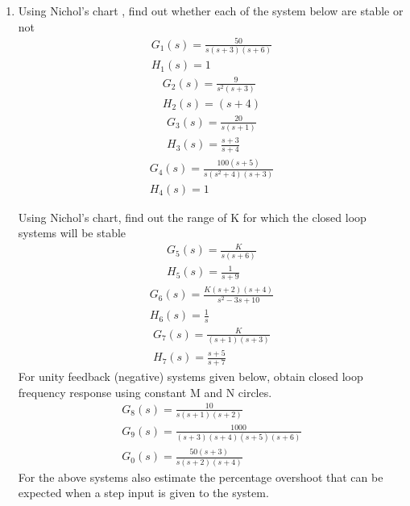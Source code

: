 \begin{enumerate}[label=\thesection.\arabic*.,ref=\thesection.\theenumi]

\item Using Nichol's chart , find out whether each of the system below are stable or not 
\begin{align}
G_1(s)= \frac{50}{s(s+3)(s+6)}
\label{eq:es17btech11009_a}
\\
 H_1(s)= 1
 \label{eq:es17btech11009_b}
\end{align}
\begin{align}
G_2(s)= \frac{9}{s^2(s+3)}
\label{eq:es17btech11009_c}
\\
 H_2(s)= (s+4)
 \label{eq:es17btech11009_d}
\end{align}
\begin{align}
G_3(s)= \frac{20}{s(s+1)}
\label{eq:es17btech11009_e}
\\
 H_3(s)= \frac{s+3}{s+4}
 \label{eq:es17btech11009_f}
\end{align}
\begin{align}
G_4(s)= \frac{100(s+5)}{s(s^2+4)(s+3)}
\label{eq:es17btech11009_g}
\\
 H_4(s)= 1
 \label{eq:es17btech11009_h}
\end{align}

Using Nichol's chart, find out the range of K for which the closed loop systems will be stable
\begin{align}
G_5(s)= \frac{K}{s(s+6)}
\label{eq:es17btech11009_i}
\\
 H_5(s)= \frac{1}{s+9}
 \label{eq:es17btech11009_j}
\end{align}
\begin{align}
G_6(s)= \frac{K(s+2)(s+4)}{s^2 - 3s +10}
\label{eq:es17btech11009_k}
\\
 H_6(s)= \frac{1}{s}
 \label{eq:es17btech11009_l}
\end{align}
\begin{align}
G_7(s)= \frac{K}{(s+1)(s+3)}
\label{eq:es17btech11009_m}
\\
 H_7(s)= \frac{s+5}{s+7}
 \label{eq:es17btech11009_n}
\end{align}
For unity feedback (negative) systems given below, obtain closed loop frequency response using constant M and N circles.
\begin{align}
G_8(s)= \frac{10}{s(s+1)(s+2)}
 \label{eq:es17btech11009_o}
 \\
G_9(s)= \frac{1000}{(s+3)(s+4)(s+5)(s+6)}
\label{eq:es17btech11009_p}
\\
G_0(s)= \frac{50(s+3)}{s(s+2)(s+4)}
\label{eq:es17btech11009_q}
\end{align}
For the above systems also estimate the percentage overshoot that can be expected when a step input is given to the system.
\\
\solution 


\end{enumerate}
